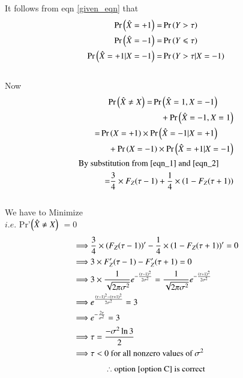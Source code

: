 \documentclass[journal,12pt,twocolumn]{IEEEtran}
\begin{document}
{%
It follows from eqn \eqref{given_eqn} that
\begin{align}
    \Pr\left(\hat{X}=+1\right)=&\Pr\left(Y>\tau\right)
    \\\Pr\left(\hat X =-1\right)=&\Pr\left(Y\leqslant\tau\right)
    \\ \Pr\left(\hat X =+1|X=-1\right)=&\Pr\left(Y>\tau|X=-1\right)
\end{align}
\\Now
\begin{align}
    \begin{split}
        \Pr\left(\hat X \neq X\right) =& \Pr\left(\hat X = 1,X=-1\right)
        \\ & \quad +  \Pr\left(\hat X = -1,X=1\right)
    \end{split}
        \\
    \begin{split}
         =&\Pr\left(X =+1\right)\times\Pr\left(\hat X=-1|X=+1\right) 
         \\&\quad+\Pr\left(X =-1\right)\times\Pr\left(\hat X=+1|X=-1\right)
    \end{split}
    \\
    \begin{split}
        \text{By substi}&\text{tution from \eqref{eqn_1} and \eqref{eqn_2}}
        \\=&\frac{3}{4} \times F_Z(\tau -1) + \frac{1}{4} \times \left(1-F_Z(\tau+1)\right)
    \end{split}
\end{align}
\\[2em]We have to Minimize 
\\$i.e.$ \;\; Pr'$\left(\hat X \neq X\right)$ $=0$
\begin{align}
    \implies & \frac{3}{4} \times \left(F_Z(\tau-1)\right)' - \frac{1}{4} \times \left(1-F_Z(\tau+1)\right)'=0
    \\ \implies & 3\times F'_Z(\tau-1) - F'_Z(\tau+1)=0
    \\\implies & 3\times\frac{1}{\sqrt{2\pi\sigma^2}}e^{-\frac{\left(\tau-1\right)^2}{2\sigma^2}}=\frac{1}{\sqrt{2\pi\sigma^2}}e^{-\frac{\left(\tau+1\right)^2}{2\sigma^2}}
    \\\implies & e^{\frac{\left(\tau-1\right)^2-\left(\tau +1\right)^2}{2\sigma^2}}=3 
    \\ \implies & e^{-\frac{2\tau}{\sigma^2}}=3
    \\ \implies & \tau = \frac{-\sigma^2\ln{3}}{2}
    \\ \implies & \tau < 0 \text{  for all nonzero values of $\sigma^2$}
\end{align}
\[\therefore \text{option \ref{option C} is correct}\]
}%
\end{document}
